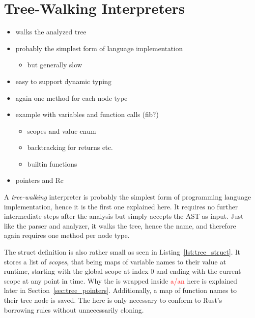 \section{Tree-Walking Interpreters}
\begin{itemize}
	\item walks the analyzed tree
	\item probably the simplest form of language implementation
	      \begin{itemize}
		      \item but generally slow
	      \end{itemize}
	\item easy to support dynamic typing
	\item again one method for each node type
	\item example with variables and function calls (fib?)
	      \begin{itemize}
		      \item scopes and value enum
		      \item backtracking for returns etc.
		      \item builtin functions
	      \end{itemize}
	\item pointers and Rc
\end{itemize}

A \emph{tree-walking} interpreter is probably the simplest form of programming language implementation, hence it is the first one explained here.
It requires no further intermediate steps after the analysis but simply accepts the AST as input.
Just like the parser and analyzer, it walks the tree, hence the name, and therefore again requires one method per node type.

The struct definition is also rather small as seen in Listing~\ref{lst:tree_struct}.
It stores a list of \emph{scopes}, that being maps of variable names to their value at runtime, starting with the global scope at index 0 and ending with the current scope at any point in time.
Why the  is wrapped inside \textcolor{red}{a/an}  here is explained later in Section~\ref{sec:tree_pointers}.
Additionally, a map of function names to their tree node is saved.
The  here is only necessary to conform to Rust's borrowing rules without unnecessarily cloning.

